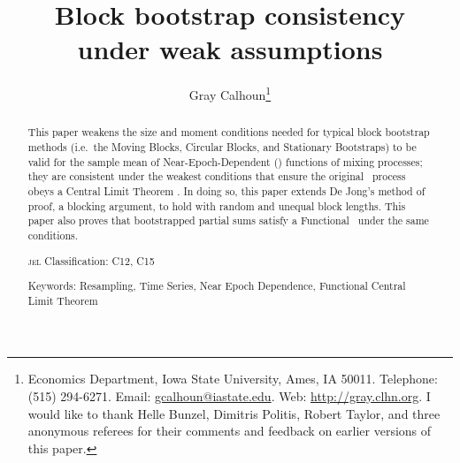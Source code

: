 \documentclass[11pt]{article}
\begin{document}
\author{Gray Calhoun\thanks{Economics Department, Iowa State
    University, Ames, IA 50011. Telephone: (515) 294-6271.  Email:
    \protect\url{gcalhoun@iastate.edu}. Web:
    \protect\url{http://gray.clhn.org}.  I would like to thank
    Helle Bunzel, Dimitris Politis, Robert Taylor, and three anonymous
    referees for their comments and feedback on earlier versions of
    this paper.}}

\title{Block bootstrap consistency\\under weak assumptions}

\maketitle

\begin{abstract}\noindent
  This paper weakens the size and moment conditions needed for typical
  block bootstrap methods (i.e.\ the Moving Blocks, Circular Blocks,
  and Stationary Bootstraps) to be valid for the sample mean of
  Near-Epoch-Dependent (\ned) functions of mixing processes; they are
  consistent under the weakest conditions that ensure the original
  \ned\ process obeys a Central Limit Theorem \citep[those
    of][\textit{Econometric Theory}]{Jon:97}.  In doing so, this paper
  extends De Jong's method of proof, a blocking argument, to hold with
  random and unequal block lengths.  This paper also proves that
  bootstrapped partial sums satisfy a Functional \clt\ under the same
  conditions.

  \noindent \textsc{jel} Classification: C12, C15

  \noindent Keywords: Resampling, Time Series, Near Epoch Dependence,
  Functional Central Limit Theorem
\end{abstract}
\end{document}
